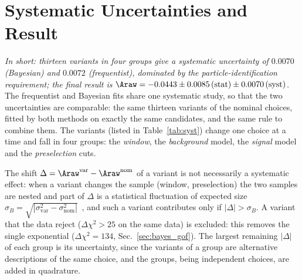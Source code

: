\section{Systematic Uncertainties and Result}
\label{sec:syst}
\emph{In short: thirteen variants in four groups give a systematic uncertainty of $0.0070$ (Bayesian) and $0.0072$ (frequentist), dominated by the particle-identification requirement; the final result is $\Araw=-0.0443\pm0.0085\,(\text{stat})\pm0.0070\,(\text{syst})$.}
The frequentist and Bayesian fits share one systematic study, so that the two uncertainties are comparable: the same thirteen variants of the nominal choices, fitted by both methods on exactly the same candidates, and the same rule to combine them. The variants (listed in Table~\ref{tab:syst}) change one choice at a time and fall in four groups: the \emph{window}, the \emph{background} model, the \emph{signal} model and the \emph{preselection} cuts.

The shift $\Delta=\Araw^{\mathrm{var}}-\Araw^{\mathrm{nom}}$ of a variant is not necessarily a systematic effect: when a variant changes the sample (window, preselection) the two samples are nested and part of $\Delta$ is a statistical fluctuation of expected size $\sigma_B=\sqrt{|\sigma_{\mathrm{var}}^2-\sigma_{\mathrm{nom}}^2|}$~\cite{barlow}, and such a variant contributes only if $|\Delta|>\sigma_B$. A variant that the data reject ($\Delta\chi^2>25$ on the same data) is excluded: this removes the single exponential ($\Delta\chi^2=134$, Sec.~\ref{sec:bayes_gof}). The largest remaining $|\Delta|$ of each group is its uncertainty, since the variants of a group are alternative descriptions of the same choice, and the groups, being independent choices, are added in quadrature.


